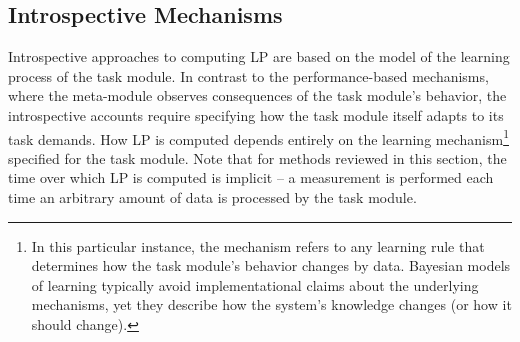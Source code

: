 

\subsection{Introspective  Mechanisms}\label{subsec:introspective_approaches}

Introspective approaches to computing \ac{LP} are based on the model of the learning process of the task module. In contrast to the performance-based mechanisms, where the meta-module observes consequences of the task module's behavior, the introspective accounts require specifying how the task module itself adapts to its task demands. How \ac{LP} is computed depends entirely on the learning mechanism\footnote{In this particular instance, the mechanism refers to any learning rule that determines how the task module's behavior changes by data. Bayesian models of learning typically avoid implementational claims about the underlying mechanisms, yet they describe how the system's knowledge changes (or how it should change).} specified for the task module. Note that for methods reviewed in this section, the time over which \ac{LP} is computed is implicit -- a measurement is performed each time an arbitrary amount of data is processed by the task module.

